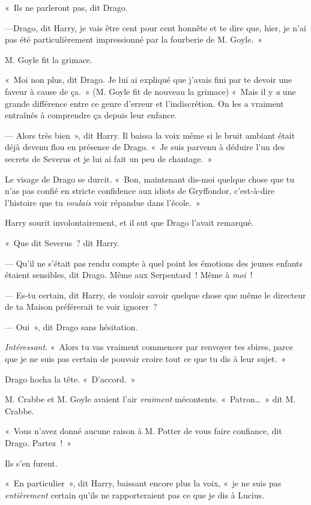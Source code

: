 «~Ils ne parleront pas, dit Drago.

---Drago, dit Harry, je vais être cent pour cent honnête et te dire que, hier, je n'ai pas été particulièrement impressionné par la fourberie de M. Goyle.~»

M. Goyle fit la grimace.

«~Moi non plus, dit Drago.
Je lui ai expliqué que j'avais fini par te devoir une faveur à cause de ça.~»
(M. Goyle fit de nouveau la grimace) «~Mais il y \emph{a} une grande différence entre ce genre d'erreur et l'indiscrétion.
On les a vraiment entraînés à comprendre ça depuis leur enfance.

--- Alors très bien~», dit Harry.
Il baissa la voix même si le bruit ambiant était déjà devenu flou en présence de Drago.
«~Je suis parvenu à déduire l'un des secrets de Severus et je lui ai fait un peu de chantage.~»

Le visage de Drago se durcit.
«~Bon, maintenant dis-moi quelque chose que tu n'as pas confié en stricte confidence aux idiots de Gryffondor, c'est-à-dire l'histoire que tu \emph{voulais} voir répandue dans l'école.~»

Harry sourit involontairement, et il sut que Drago l'avait remarqué.

«~Que dit Severus~? dit Harry.

--- Qu'il ne s'était pas rendu compte à quel point les émotions des jeunes enfants étaient sensibles, dit Drago.
Même aux Serpentard~!
Même à \emph{moi}~!

--- Es-tu certain, dit Harry, de vouloir savoir quelque chose que même le directeur de ta Maison préférerait te voir ignorer~?

--- Oui~», dit Drago sans hésitation.

\emph{Intéressant}.
«~Alors tu vas vraiment commencer par renvoyer tes sbires, parce que je ne suis pas certain de pouvoir croire tout ce que tu dis à leur sujet.~»

Drago hocha la tête.
«~D'accord.~»

M. Crabbe et M. Goyle avaient l'air \emph{vraiment} mécontents.
«~Patron…~»
dit M. Crabbe.

«~Vous n'avez donné aucune raison à M. Potter de vous faire confiance, dit Drago.
Partez~!~»

Ils s'en furent.

«~En particulier~», dit Harry, baissant encore plus la voix, «~je ne suis pas \emph{entièrement} certain qu'ils ne rapporteraient pas ce que je dis à Lucius.


